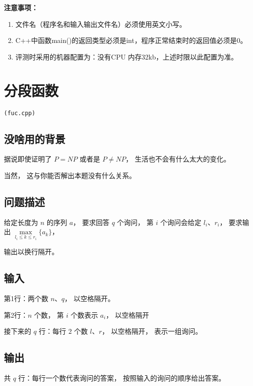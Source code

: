 \documentclass[UTF8]{ctexart}
\begin{document}
\textbf{注意事项：}
\begin{enumerate}
    \item{文件名（程序名和输入输出文件名）必须使用英文小写。}
    \item{C++中函数main()的返回类型必须是int，程序正常结束时的返回值必须是0。}
    \item{评测时采用的机器配置为：没有CPU 内存32kb，上述时限以此配置为准。}
\end{enumerate}

\newpage
\setcounter{page}{1}
\pagestyle{plain}

\newpage
\section{分段函数}
\begin{center}
\tt\large{(fuc.cpp)}
\end{center}

\subsection{没啥用的背景}

据说即使证明了 $P=NP$ 或者是 $P\neq NP$， 生活也不会有什么太大的变化。

当然， 这与你能否解出本题没有什么关系。

\subsection{问题描述}

给定长度为 $n$ 的序列 $a$， 要求回答 $q$ 个询问， 第 $i$ 个询问会给定 $l_i、r_i$， 要求输出 $\max\limits_{l_i\le k \le r_i} \lbrace a_k \rbrace$， 

输出以换行隔开。

\subsection{输入}

第1行：两个数 $n$、$q$， 以空格隔开。

第2行：$n$ 个数， 第 $i$ 个数表示 $a_i$， 以空格隔开

接下来的 $q$ 行：每行 $2$ 个数 $l$、$r$， 以空格隔开， 表示一组询问。

\subsection{输出}

共 $q$ 行：每行一个数代表询问的答案， 按照输入的询问的顺序给出答案。
\end{document}
